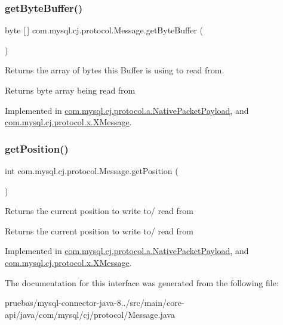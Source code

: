 \subsubsection{\texorpdfstring{get\+Byte\+Buffer()}{getByteBuffer()}}
{\footnotesize\ttfamily byte \mbox{[}$\,$\mbox{]} com.\+mysql.\+cj.\+protocol.\+Message.\+get\+Byte\+Buffer (\begin{DoxyParamCaption}{ }\end{DoxyParamCaption})}

Returns the array of bytes this Buffer is using to read from.

\begin{DoxyReturn}{Returns}
byte array being read from 
\end{DoxyReturn}


Implemented in \mbox{\hyperlink{classcom_1_1mysql_1_1cj_1_1protocol_1_1a_1_1_native_packet_payload_a9aad2cb05c0a41d027987a601991e1a0}{com.\+mysql.\+cj.\+protocol.\+a.\+Native\+Packet\+Payload}}, and \mbox{\hyperlink{classcom_1_1mysql_1_1cj_1_1protocol_1_1x_1_1_x_message_ae2dfe8871615d85dbd7a8a7320a5025a}{com.\+mysql.\+cj.\+protocol.\+x.\+X\+Message}}.

\mbox{\label{interfacecom_1_1mysql_1_1cj_1_1protocol_1_1_message_a87a2626f6e5aceccffe224bcaf0e126b}} 
\subsubsection{\texorpdfstring{get\+Position()}{getPosition()}}
{\footnotesize\ttfamily int com.\+mysql.\+cj.\+protocol.\+Message.\+get\+Position (\begin{DoxyParamCaption}{ }\end{DoxyParamCaption})}

Returns the current position to write to/ read from

\begin{DoxyReturn}{Returns}
the current position to write to/ read from 
\end{DoxyReturn}


Implemented in \mbox{\hyperlink{classcom_1_1mysql_1_1cj_1_1protocol_1_1a_1_1_native_packet_payload_a89ff1dc3fa0998b1362a9fc2351d6797}{com.\+mysql.\+cj.\+protocol.\+a.\+Native\+Packet\+Payload}}, and \mbox{\hyperlink{classcom_1_1mysql_1_1cj_1_1protocol_1_1x_1_1_x_message_a5aa5c54128a10a7280a2113c4e24aeb9}{com.\+mysql.\+cj.\+protocol.\+x.\+X\+Message}}.



The documentation for this interface was generated from the following file\+:\begin{DoxyCompactItemize}
\item 
pruebas/mysql-\/connector-\/java-\/8../src/main/core-\/api/java/com/mysql/cj/protocol/Message.\+java\end{DoxyCompactItemize}
